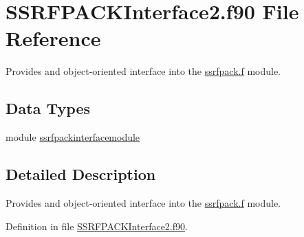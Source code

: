 \hypertarget{SSRFPACKInterface2_8f90}{\section{S\+S\+R\+F\+P\+A\+C\+K\+Interface2.\+f90 File Reference}
\label{SSRFPACKInterface2_8f90}
}


Provides and object-\/oriented interface into the \hyperlink{ssrfpack_8f}{ssrfpack.\+f} module.  


\subsection*{Data Types}
\begin{DoxyCompactItemize}
\item 
module \hyperlink{classssrfpackinterfacemodule}{ssrfpackinterfacemodule}
\end{DoxyCompactItemize}


\subsection{Detailed Description}
Provides and object-\/oriented interface into the \hyperlink{ssrfpack_8f}{ssrfpack.\+f} module. 



Definition in file \hyperlink{SSRFPACKInterface2_8f90_source}{S\+S\+R\+F\+P\+A\+C\+K\+Interface2.\+f90}.

